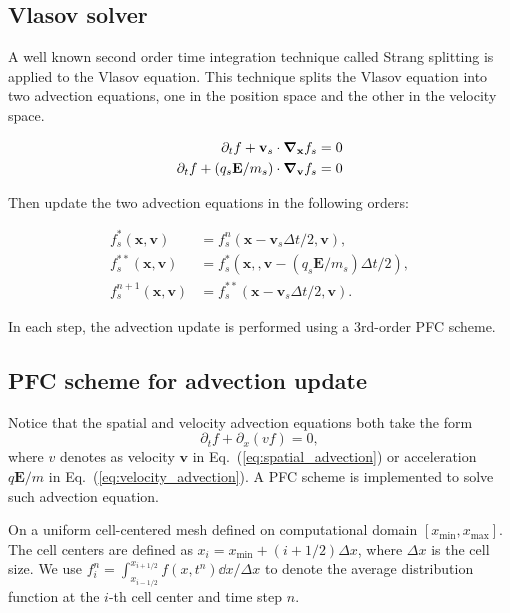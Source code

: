 \subsection{Vlasov solver}
A well known second order time integration technique called Strang splitting is applied to the Vlasov equation. This technique splits the Vlasov equation into two advection equations, one in the position space and the other in the velocity space.

\begin{align}
	\label{eq:spatial_advection}
	\partial_t f + \mathbf{v}_s\cdot\grad_{\mathbf{x}} f_s = 0 \\
	\label{eq:velocity_advection}
	\partial_t f + (q_s\mathbf{E}/m_s)\cdot\grad_{\mathbf{v}} f_s = 0
\end{align}

Then update the two advection equations in the following orders:

\begin{equation}
	\label{eq:strang-splitting}
	\begin{aligned}
		f_s^{*}(\mathbf{x}, \mathbf{v})   & = f_s^n(\mathbf{x} - \mathbf{v}_s\Delta t/2, \mathbf{v}),           \\
		f_s^{**}(\mathbf{x}, \mathbf{v})  & = f_s^{*}(\mathbf{x}, , \mathbf{v}- (q_s\mathbf{E}/m_s)\Delta t/2), \\
		f_s^{n+1}(\mathbf{x}, \mathbf{v}) & = f_s^{**}(\mathbf{x} - \mathbf{v}_s\Delta t/2, \mathbf{v}).
	\end{aligned}
\end{equation}

In each step, the advection update is performed using a 3rd-order PFC scheme.

\subsection{PFC scheme for advection update}
Notice that the spatial and velocity advection equations both take the form
\begin{equation}
	\partial_t f + \partial_x(vf) = 0,
	\label{eq:advection_simplified}
\end{equation}
where $v$ denotes as velocity $\mathbf{v}$ in Eq.~(\ref{eq:spatial_advection}) or acceleration $q\mathbf{E}/m$ in Eq.~(\ref{eq:velocity_advection}). A PFC scheme is implemented to solve such advection equation.

On a uniform cell-centered mesh defined on computational domain $[x_{\text{min}}, x_{\text{max}}]$. The cell centers are defined as $x_i = x_{\text{min}} + (i+1/2)\Delta x$, where $\Delta x$ is the cell size. We use $f_i^n=\int_{x_{i-1/2}}^{x_{i+1/2}} f(x,t^n)\dd x/\Delta x$ to denote the average distribution function at the $i$-th cell center and time step $n$.

